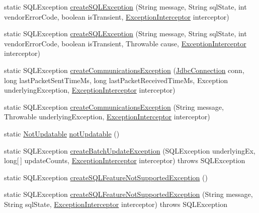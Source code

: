 \begin{DoxyCompactItemize}
\item 
static S\+Q\+L\+Exception \mbox{\hyperlink{classcom_1_1mysql_1_1cj_1_1jdbc_1_1exceptions_1_1_s_q_l_error_afaec4b0c520a82a09774a4fc1e1c031c}{create\+S\+Q\+L\+Exception}} (String message, String sql\+State, int vendor\+Error\+Code, boolean is\+Transient, \mbox{\hyperlink{interfacecom_1_1mysql_1_1cj_1_1exceptions_1_1_exception_interceptor}{Exception\+Interceptor}} interceptor)
\item 
static S\+Q\+L\+Exception \mbox{\hyperlink{classcom_1_1mysql_1_1cj_1_1jdbc_1_1exceptions_1_1_s_q_l_error_a40f7682ec06e149fd043197f32633fb6}{create\+S\+Q\+L\+Exception}} (String message, String sql\+State, int vendor\+Error\+Code, boolean is\+Transient, Throwable cause, \mbox{\hyperlink{interfacecom_1_1mysql_1_1cj_1_1exceptions_1_1_exception_interceptor}{Exception\+Interceptor}} interceptor)
\item 
static S\+Q\+L\+Exception \mbox{\hyperlink{classcom_1_1mysql_1_1cj_1_1jdbc_1_1exceptions_1_1_s_q_l_error_a43b88f243a21b18c87df8376ec18797a}{create\+Communications\+Exception}} (\mbox{\hyperlink{interfacecom_1_1mysql_1_1cj_1_1jdbc_1_1_jdbc_connection}{Jdbc\+Connection}} conn, long last\+Packet\+Sent\+Time\+Ms, long last\+Packet\+Received\+Time\+Ms, Exception underlying\+Exception, \mbox{\hyperlink{interfacecom_1_1mysql_1_1cj_1_1exceptions_1_1_exception_interceptor}{Exception\+Interceptor}} interceptor)
\item 
static S\+Q\+L\+Exception \mbox{\hyperlink{classcom_1_1mysql_1_1cj_1_1jdbc_1_1exceptions_1_1_s_q_l_error_ad901a4f9ecc207b09860f8f8736829ee}{create\+Communications\+Exception}} (String message, Throwable underlying\+Exception, \mbox{\hyperlink{interfacecom_1_1mysql_1_1cj_1_1exceptions_1_1_exception_interceptor}{Exception\+Interceptor}} interceptor)
\item 
static \mbox{\hyperlink{classcom_1_1mysql_1_1cj_1_1jdbc_1_1exceptions_1_1_not_updatable}{Not\+Updatable}} \mbox{\hyperlink{classcom_1_1mysql_1_1cj_1_1jdbc_1_1exceptions_1_1_s_q_l_error_a29c9a6726ffb8e42e79692693a605a01}{not\+Updatable}} ()
\item 
static S\+Q\+L\+Exception \mbox{\hyperlink{classcom_1_1mysql_1_1cj_1_1jdbc_1_1exceptions_1_1_s_q_l_error_ad5fbaafacc50a60f52cff3a129d1c9a8}{create\+Batch\+Update\+Exception}} (S\+Q\+L\+Exception underlying\+Ex, long\mbox{[}$\,$\mbox{]} update\+Counts, \mbox{\hyperlink{interfacecom_1_1mysql_1_1cj_1_1exceptions_1_1_exception_interceptor}{Exception\+Interceptor}} interceptor)  throws S\+Q\+L\+Exception 
\item 
static S\+Q\+L\+Exception \mbox{\hyperlink{classcom_1_1mysql_1_1cj_1_1jdbc_1_1exceptions_1_1_s_q_l_error_a2ad9561685f7235ef3ff3d52220f5e44}{create\+S\+Q\+L\+Feature\+Not\+Supported\+Exception}} ()
\item 
static S\+Q\+L\+Exception \mbox{\hyperlink{classcom_1_1mysql_1_1cj_1_1jdbc_1_1exceptions_1_1_s_q_l_error_ab839381274c7a56aafc61f84cb39373f}{create\+S\+Q\+L\+Feature\+Not\+Supported\+Exception}} (String message, String sql\+State, \mbox{\hyperlink{interfacecom_1_1mysql_1_1cj_1_1exceptions_1_1_exception_interceptor}{Exception\+Interceptor}} interceptor)  throws S\+Q\+L\+Exception 
\end{DoxyCompactItemize}


